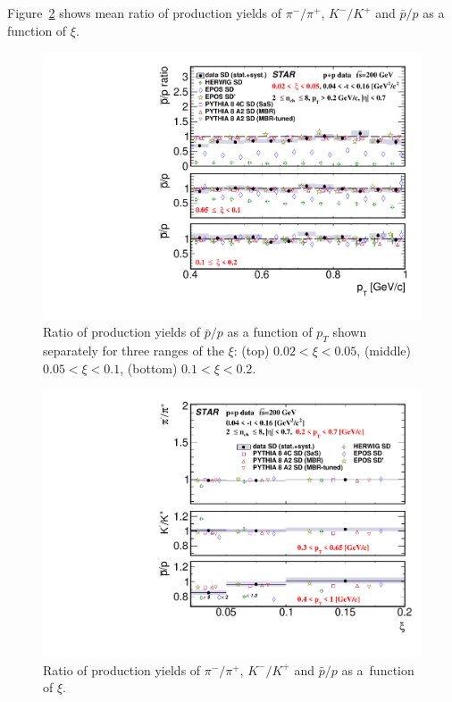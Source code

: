 Figure~\ref{fig:results_mean_ratio_star} shows mean ratio of production yields of $\pi^-/\pi^+$, $K^-/K^+$ and $\bar{p}/p$ as a function of  $\xi$.

\begin{figure}[h!]
	\centering
	\includegraphics[width=.99\textwidth,page=1]{chapters/chrgSTAR/img/results/particleRatio_prt_2.pdf}
	\caption[Ratio of production yields of $\bar{p}/p$ as a function of $p_T$ shown separately for three ranges of the $\xi$.]{Ratio of production yields of $\bar{p}/p$ as a function of $p_T$ shown separately for three ranges of the $\xi$: (top) $0.02<\xi<0.05$, (middle) $0.05<\xi<0.1$, (bottom) $0.1<\xi<0.2$.}
	\label{fig:results_star_proton}
	
\end{figure}

\begin{figure}[h!]
	\centering
	\includegraphics[width=.99\textwidth,page=1]{chapters/chrgSTAR/img/results/ratio_xi.pdf}
	\caption{Ratio of production yields of $\pi^-/\pi^+$, $K^-/K^+$ and $\bar{p}/p$ as a~function of $\xi$. }
	\label{fig:results_mean_ratio_star}
	
\end{figure}